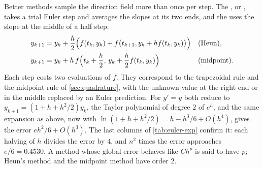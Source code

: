 Better methods sample the direction field more than once per step. The , or , takes a trial Euler step and averages the slopes at its two ends, and the  uses the slope at the middle of a half step:
\begin{align*}
y_{k+1}&=y_k+\frac h2\Bigl(f(t_k,y_k)+f\bigl(t_{k+1},y_k+hf(t_k,y_k)\bigr)\Bigr)&&\text{(Heun)},\\
y_{k+1}&=y_k+h\,f\Bigl(t_k+\frac h2,\,y_k+\frac h2f(t_k,y_k)\Bigr)&&\text{(midpoint)}.
\end{align*}
Each step costs two evaluations of $f$. They correspond to the trapezoidal rule and the midpoint rule of \cref{sec:quadrature}, with the unknown value at the right end or in the middle replaced by an Euler prediction. For $y'=y$ both reduce to $y_{k+1}=(1+h+h^2/2)y_k$, the Taylor polynomial of degree $2$ of $e^h$, and the same expansion as above, now with $\ln(1+h+h^2/2)=h-h^3/6+O(h^4)$, gives the error $eh^2/6+O(h^3)$. The last columns of \cref{tab:euler-exp} confirm it: each halving of $h$ divides the error by $4$, and $n^2$ times the error approaches $e/6=0.4530$. A method whose global error behaves like $Ch^p$ is said to have  $p$; Heun's method and the midpoint method have order $2$.

\begin{table}
\end{table}

